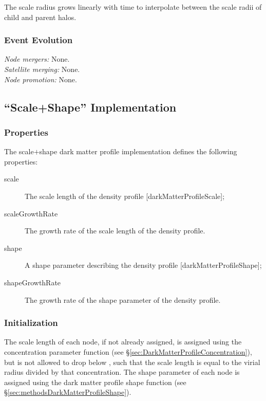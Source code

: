 The scale radius grows linearly with time to interpolate between the scale radii of child and parent halos.

\subsubsection{Event Evolution}

\noindent\emph{Node mergers:} None.\\

\noindent\emph{Satellite merging:} None.\\

\noindent\emph{Node promotion:} None.\\

\subsection{``Scale+Shape'' Implementation}\label{sec:DarkMatterProfileScaleShape}

\subsubsection{Properties}

The scale$+$shape dark matter profile implementation defines the following properties:
\begin{description}
 \item [{\normalfont \ttfamily scale}] The scale length of the density profile [{\normalfont \ttfamily darkMatterProfileScale}];
 \item [{\normalfont \ttfamily scaleGrowthRate}] The growth rate of the scale length of the density profile.
 \item [{\normalfont \ttfamily shape}] A shape parameter describing the density profile [{\normalfont \ttfamily darkMatterProfileShape}];
 \item [{\normalfont \ttfamily shapeGrowthRate}] The growth rate of the shape parameter of the density profile.
\end{description}

\subsubsection{Initialization}

The scale length of each node, if not already assigned, is assigned using the concentration parameter function (see \S\ref{sec:DarkMatterProfileConcentration}), but is not allowed to drop below {\normalfont \ttfamily [darkMatterProfileMinimumConcentration]}, such that the scale length is equal to the virial radius divided by that concentration. The shape parameter of each \gls{node} is assigned using the dark matter profile shape function (see \S\ref{sec:methodsDarkMatterProfileShape}).

